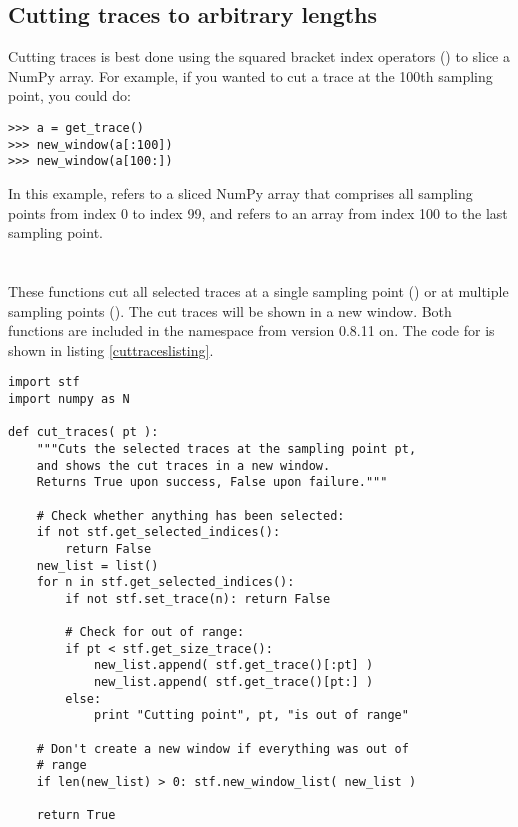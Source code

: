 \subsection{Cutting traces to arbitrary lengths}
Cutting traces is best
done using the squared bracket index operators (\pycommand{[]}) to slice a NumPy array. For example, if you wanted to cut a trace at the 100th sampling point, you could do:
\begin{lstlisting}
>>> a = get_trace()
>>> new_window(a[:100])
>>> new_window(a[100:])
\end{lstlisting}
In this example,  refers to a sliced NumPy array that comprises all sampling points from index 0 to index 99, and  refers to an array from index 100 to the last sampling point. \smallskip \\
\\
\\
These functions cut all selected traces at a single sampling point () or at multiple sampling points (). The cut traces will be shown in a new window. Both functions are included in the  namespace from version 0.8.11 on. The code for  is shown in listing \ref{cuttraceslisting}.
\begin{listing}
\lstset{numbers=left}
\begin{lstlisting}
import stf
import numpy as N

def cut_traces( pt ):
    """Cuts the selected traces at the sampling point pt,
    and shows the cut traces in a new window.
    Returns True upon success, False upon failure."""

    # Check whether anything has been selected:
    if not stf.get_selected_indices():
        return False
    new_list = list()
    for n in stf.get_selected_indices():
        if not stf.set_trace(n): return False

        # Check for out of range:
        if pt < stf.get_size_trace():
            new_list.append( stf.get_trace()[:pt] )
            new_list.append( stf.get_trace()[pt:] )
        else:
            print "Cutting point", pt, "is out of range"

    # Don't create a new window if everything was out of
    # range
    if len(new_list) > 0: stf.new_window_list( new_list )

    return True
\end{lstlisting}
\lstset{numbers=none}
  \caption {
  }
  \label{cuttraceslisting}
\end{listing}
